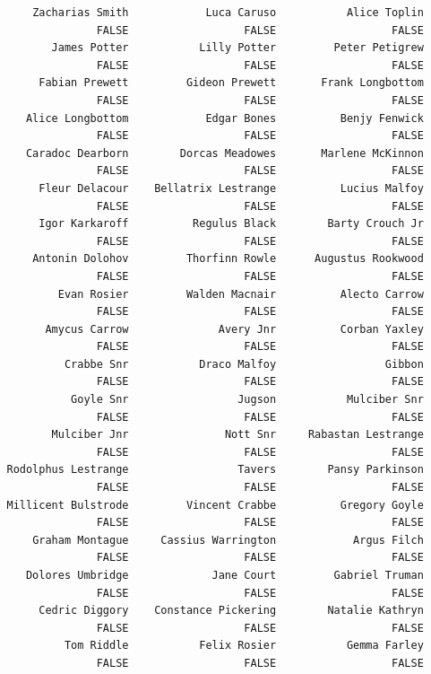 \documentclass[
  letterpaper,
  DIV=11,
  numbers=noendperiod]{scrreprt}
\begin{document}
\begin{verbatim}
       Zacharias Smith            Luca Caruso           Alice Toplin 
                 FALSE                  FALSE                  FALSE 
          James Potter           Lilly Potter         Peter Petigrew 
                 FALSE                  FALSE                  FALSE 
        Fabian Prewett         Gideon Prewett       Frank Longbottom 
                 FALSE                  FALSE                  FALSE 
      Alice Longbottom            Edgar Bones          Benjy Fenwick 
                 FALSE                  FALSE                  FALSE 
      Caradoc Dearborn        Dorcas Meadowes       Marlene McKinnon 
                 FALSE                  FALSE                  FALSE 
        Fleur Delacour    Bellatrix Lestrange          Lucius Malfoy 
                 FALSE                  FALSE                  FALSE 
        Igor Karkaroff          Regulus Black        Barty Crouch Jr 
                 FALSE                  FALSE                  FALSE 
       Antonin Dolohov         Thorfinn Rowle      Augustus Rookwood 
                 FALSE                  FALSE                  FALSE 
           Evan Rosier         Walden Macnair          Alecto Carrow 
                 FALSE                  FALSE                  FALSE 
         Amycus Carrow              Avery Jnr          Corban Yaxley 
                 FALSE                  FALSE                  FALSE 
            Crabbe Snr           Draco Malfoy                 Gibbon 
                 FALSE                  FALSE                  FALSE 
             Goyle Snr                 Jugson           Mulciber Snr 
                 FALSE                  FALSE                  FALSE 
          Mulciber Jnr               Nott Snr     Rabastan Lestrange 
                 FALSE                  FALSE                  FALSE 
   Rodolphus Lestrange                 Tavers        Pansy Parkinson 
                 FALSE                  FALSE                  FALSE 
   Millicent Bulstrode         Vincent Crabbe          Gregory Goyle 
                 FALSE                  FALSE                  FALSE 
       Graham Montague     Cassius Warrington            Argus Filch 
                 FALSE                  FALSE                  FALSE 
      Dolores Umbridge             Jane Court         Gabriel Truman 
                 FALSE                  FALSE                  FALSE 
        Cedric Diggory    Constance Pickering        Natalie Kathryn 
                 FALSE                  FALSE                  FALSE 
            Tom Riddle           Felix Rosier           Gemma Farley 
                 FALSE                  FALSE                  FALSE 

\end{verbatim}
\end{document}
